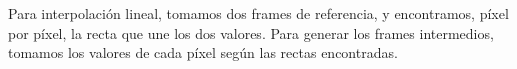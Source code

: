 \par Para interpolaci\'on lineal, tomamos dos frames de referencia, y encontramos, píxel por píxel, la recta que une los dos valores.
Para generar los frames intermedios, tomamos los valores de cada píxel seg\'un las rectas encontradas.
